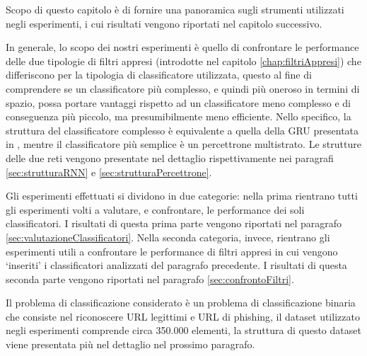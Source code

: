 \documentclass[../../main.tex]{subfiles}
\begin{document}
    Scopo di questo capitolo è di fornire una panoramica sugli strumenti utilizzati negli esperimenti, i cui risultati vengono riportati nel capitolo successivo. 
    
    In generale, lo scopo dei nostri esperimenti è quello di confrontare le performance delle due tipologie di filtri appresi (introdotte nel capitolo \ref{chap:filtriAppresi}) che differiscono per la tipologia di classificatore utilizzata, questo al fine di comprendere se un classificatore più complesso, e quindi più oneroso in termini di spazio, possa portare vantaggi rispetto ad un classificatore meno complesso e di conseguenza più piccolo, ma presumibilmente meno efficiente. Nello specifico, la struttura del classificatore complesso è equivalente a quella della GRU presentata in \cite{ma2020}, mentre il classificatore più semplice è un percettrone multistrato. Le strutture delle due reti vengono presentate nel dettaglio rispettivamente nei paragrafi \ref{sec:strutturaRNN} e \ref{sec:strutturaPercettrone}.

    Gli esperimenti effettuati si dividono in due categorie: nella prima rientrano tutti gli esperimenti volti a valutare, e confrontare, le performance dei soli classificatori. I risultati di questa prima parte vengono riportati nel paragrafo \ref{sec:valutazioneClassificatori}. Nella seconda categoria, invece, rientrano gli esperimenti utili a confrontare le performance di filtri appresi in cui vengono `inseriti' i classificatori analizzati del paragrafo precedente. I risultati di questa seconda parte vengono riportati nel paragrafo \ref{sec:confrontoFiltri}.

    Il problema di classificazione considerato è un problema di classificazione binaria che consiste nel riconoscere URL legittimi e URL di phishing, il dataset utilizzato negli esperimenti comprende circa 350.000 elementi, la struttura di questo dataset viene presentata più nel dettaglio nel prossimo paragrafo. 
\end{document}

